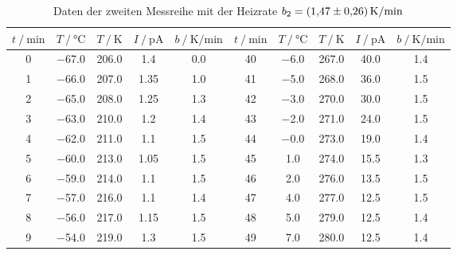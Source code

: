  \begin{table}
    \centering
    \caption{Daten der zweiten Messreihe mit der Heizrate $b_2 = \qty{1.47+-0.26}{\kelvin\per\minute}$}
    \label{tab:measurements_2}
    \begin{tabular}{S S S S S | S S S S S}
      \toprule
      {$t \mathbin{/} \unit{\minute}$} & {$T \mathbin{/} \unit{\celsius}$} & {$T \mathbin{/} \unit{\kelvin}$} &%
      {$I \mathbin{/} \unit{\pico\ampere}$} & {$b \mathbin{/} \unit{\kelvin\per\minute}$} & {$t \mathbin{/} \unit{\minute}$} &%
      {$T \mathbin{/} \unit{\celsius}$} & {$T \mathbin{/} \unit{\kelvin}$} & {$I \mathbin{/} \unit{\pico\ampere}$} &%
      {$b \mathbin{/} \unit{\kelvin\per\minute}$}\\
      \midrule
      \num{ 0} &  \num{-67.0} &  \num{206.0} &  \num{ 1.4 } &  \num{0.0} & \num{40} &  \num{ -6.0} &  \num{267.0} &  \num{40.0 } &  \num{1.4} \\
      \num{ 1} &  \num{-66.0} &  \num{207.0} &  \num{ 1.35} &  \num{1.0} & \num{41} &  \num{ -5.0} &  \num{268.0} &  \num{36.0 } &  \num{1.5} \\
      \num{ 2} &  \num{-65.0} &  \num{208.0} &  \num{ 1.25} &  \num{1.3} & \num{42} &  \num{ -3.0} &  \num{270.0} &  \num{30.0 } &  \num{1.5} \\ 
      \num{ 3} &  \num{-63.0} &  \num{210.0} &  \num{ 1.2 } &  \num{1.4} & \num{43} &  \num{ -2.0} &  \num{271.0} &  \num{24.0 } &  \num{1.5} \\ 
      \num{ 4} &  \num{-62.0} &  \num{211.0} &  \num{ 1.1 } &  \num{1.5} & \num{44} &  \num{ -0.0} &  \num{273.0} &  \num{19.0 } &  \num{1.4} \\ 
      \num{ 5} &  \num{-60.0} &  \num{213.0} &  \num{ 1.05} &  \num{1.5} & \num{45} &  \num{  1.0} &  \num{274.0} &  \num{15.5 } &  \num{1.3} \\ 
      \num{ 6} &  \num{-59.0} &  \num{214.0} &  \num{ 1.1 } &  \num{1.5} & \num{46} &  \num{  2.0} &  \num{276.0} &  \num{13.5 } &  \num{1.5} \\ 
      \num{ 7} &  \num{-57.0} &  \num{216.0} &  \num{ 1.1 } &  \num{1.4} & \num{47} &  \num{  4.0} &  \num{277.0} &  \num{12.5 } &  \num{1.5} \\ 
      \num{ 8} &  \num{-56.0} &  \num{217.0} &  \num{ 1.15} &  \num{1.5} & \num{48} &  \num{  5.0} &  \num{279.0} &  \num{12.5 } &  \num{1.4} \\ 
      \num{ 9} &  \num{-54.0} &  \num{219.0} &  \num{ 1.3 } &  \num{1.5} & \num{49} &  \num{  7.0} &  \num{280.0} &  \num{12.5 } &  \num{1.4} \\ 

\end{tabular}
\end{table}
